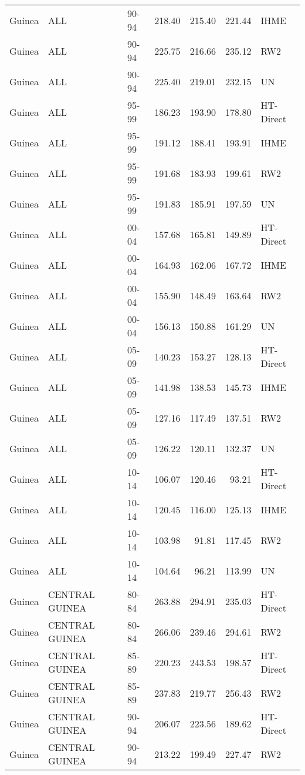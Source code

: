 \begin{longtable}{lllrrrl}
  Guinea & ALL & 90-94 & 218.40 & 215.40 & 221.44 & IHME \\ 
  Guinea & ALL & 90-94 & 225.75 & 216.66 & 235.12 & RW2 \\ 
  Guinea & ALL & 90-94 & 225.40 & 219.01 & 232.15 & UN \\ 
  Guinea & ALL & 95-99 & 186.23 & 193.90 & 178.80 & HT-Direct \\ 
  Guinea & ALL & 95-99 & 191.12 & 188.41 & 193.91 & IHME \\ 
  Guinea & ALL & 95-99 & 191.68 & 183.93 & 199.61 & RW2 \\ 
  Guinea & ALL & 95-99 & 191.83 & 185.91 & 197.59 & UN \\ 
  Guinea & ALL & 00-04 & 157.68 & 165.81 & 149.89 & HT-Direct \\ 
  Guinea & ALL & 00-04 & 164.93 & 162.06 & 167.72 & IHME \\ 
  Guinea & ALL & 00-04 & 155.90 & 148.49 & 163.64 & RW2 \\ 
  Guinea & ALL & 00-04 & 156.13 & 150.88 & 161.29 & UN \\ 
  Guinea & ALL & 05-09 & 140.23 & 153.27 & 128.13 & HT-Direct \\ 
  Guinea & ALL & 05-09 & 141.98 & 138.53 & 145.73 & IHME \\ 
  Guinea & ALL & 05-09 & 127.16 & 117.49 & 137.51 & RW2 \\ 
  Guinea & ALL & 05-09 & 126.22 & 120.11 & 132.37 & UN \\ 
  Guinea & ALL & 10-14 & 106.07 & 120.46 & 93.21 & HT-Direct \\ 
  Guinea & ALL & 10-14 & 120.45 & 116.00 & 125.13 & IHME \\ 
  Guinea & ALL & 10-14 & 103.98 & 91.81 & 117.45 & RW2 \\ 
  Guinea & ALL & 10-14 & 104.64 & 96.21 & 113.99 & UN \\ 
  Guinea & CENTRAL GUINEA & 80-84 & 263.88 & 294.91 & 235.03 & HT-Direct \\ 
  Guinea & CENTRAL GUINEA & 80-84 & 266.06 & 239.46 & 294.61 & RW2 \\ 
  Guinea & CENTRAL GUINEA & 85-89 & 220.23 & 243.53 & 198.57 & HT-Direct \\ 
  Guinea & CENTRAL GUINEA & 85-89 & 237.83 & 219.77 & 256.43 & RW2 \\ 
  Guinea & CENTRAL GUINEA & 90-94 & 206.07 & 223.56 & 189.62 & HT-Direct \\ 
  Guinea & CENTRAL GUINEA & 90-94 & 213.22 & 199.49 & 227.47 & RW2 \\ 

\end{longtable}
